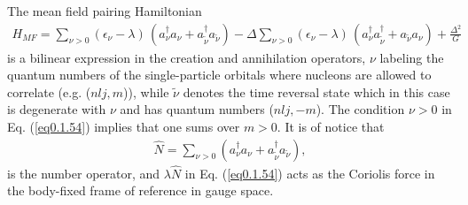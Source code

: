  The mean field pairing Hamiltonian 
\begin{align}\label{eq0.1.54}
H_{MF}=\sum_{\nu>0}(\epsilon_\nu-\lambda)\,(a^\dagger_\nu a_\nu+a^\dagger_{\tilde\nu} a_{\tilde\nu})-\Delta\sum_{\nu>0}(\epsilon_\nu-\lambda)\,(a^\dagger_\nu a^\dagger_{\tilde\nu}+a_{\tilde\nu} a_{\nu})+\frac{\Delta^2}{G}
\end{align}
is a bilinear expression in the creation and annihilation operators, $\nu$ labeling the quantum numbers of the single-particle orbitals where nucleons are allowed to correlate (e.g. ($nlj,m$)), while $\tilde \nu$ denotes the time reversal state which in this case is degenerate with $\nu$ and has quantum numbers ($nlj,-m$). The condition $\nu>0$ in Eq. (\ref{eq0.1.54}) implies that one sums over $m>0$. It is of notice that 
\begin{align}\label{eq0.1.55}
\hat N=\sum_{\nu>0}(a^\dagger_\nu a_\nu+a^\dagger_{\tilde\nu} a_{\tilde\nu}),
\end{align}
is the number operator, and $\lambda \hat N$ in Eq. (\ref{eq0.1.54}) acts as the Coriolis force in the body-fixed frame of reference  in gauge space. 

